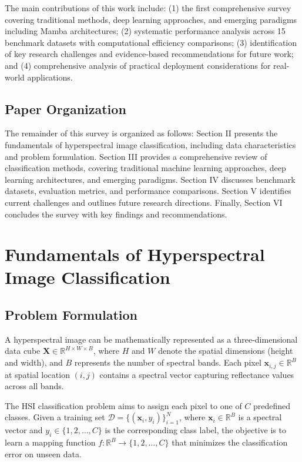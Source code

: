 \documentclass[journal]{IEEEtran}
\begin{document}
The main contributions of this work include: (1) the first comprehensive survey covering traditional methods, deep learning approaches, and emerging paradigms including Mamba architectures; (2) systematic performance analysis across 15 benchmark datasets with computational efficiency comparisons; (3) identification of key research challenges and evidence-based recommendations for future work; and (4) comprehensive analysis of practical deployment considerations for real-world applications.

\subsection{Paper Organization}

The remainder of this survey is organized as follows: Section II presents the fundamentals of hyperspectral image classification, including data characteristics and problem formulation. Section III provides a comprehensive review of classification methods, covering traditional machine learning approaches, deep learning architectures, and emerging paradigms. Section IV discusses benchmark datasets, evaluation metrics, and performance comparisons. Section V identifies current challenges and outlines future research directions. Finally, Section VI concludes the survey with key findings and recommendations.

\section{Fundamentals of Hyperspectral Image Classification}

\subsection{Problem Formulation}

A hyperspectral image can be mathematically represented as a three-dimensional data cube $\mathbf{X} \in \mathbb{R}^{H \times W \times B}$, where $H$ and $W$ denote the spatial dimensions (height and width), and $B$ represents the number of spectral bands. Each pixel $\mathbf{x}_{i,j} \in \mathbb{R}^{B}$ at spatial location $(i,j)$ contains a spectral vector capturing reflectance values across all bands.

The HSI classification problem aims to assign each pixel to one of $C$ predefined classes. Given a training set $\mathcal{D} = \{(\mathbf{x}_i, y_i)\}_{i=1}^{N}$, where $\mathbf{x}_i \in \mathbb{R}^{B}$ is a spectral vector and $y_i \in \{1, 2, \ldots, C\}$ is the corresponding class label, the objective is to learn a mapping function $f: \mathbb{R}^{B} \rightarrow \{1, 2, \ldots, C\}$ that minimizes the classification error on unseen data.
\end{document}
